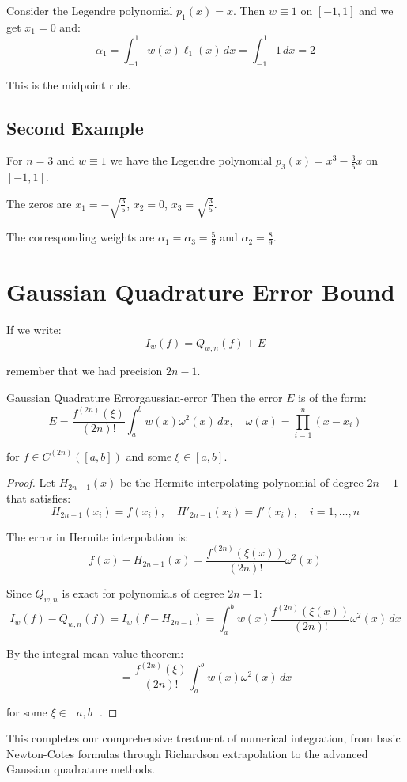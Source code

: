 Consider the Legendre polynomial $p_1(x) = x$. Then $w \equiv 1$ on $[-1,1]$ and we get $x_1 = 0$ and:
\[\alpha_1 = \int_{-1}^1 w(x) \ell_1(x) \, dx = \int_{-1}^1 1 \, dx = 2\]

This is the midpoint rule.

\subsection{Second Example}

For $n = 3$ and $w \equiv 1$ we have the Legendre polynomial $p_3(x) = x^3 - \frac{3}{5}x$ on $[-1,1]$.

The zeros are $x_1 = -\sqrt{\frac{3}{5}}$, $x_2 = 0$, $x_3 = \sqrt{\frac{3}{5}}$.

The corresponding weights are $\alpha_1 = \alpha_3 = \frac{5}{9}$ and $\alpha_2 = \frac{8}{9}$.

\section{Gaussian Quadrature Error Bound}

If we write:
\[I_w(f) = Q_{w,n}(f) + E\]

remember that we had precision $2n-1$.

\begin{theorem}{Gaussian Quadrature Error}{gaussian-error}
    Then the error $E$ is of the form:
    \[E = \frac{f^{(2n)}(\xi)}{(2n)!} \int_a^b w(x) \omega^2(x) \, dx, \quad \omega(x) = \prod_{i=1}^n (x - x_i)\]

    for $f \in C^{(2n)}([a,b])$ and some $\xi \in [a,b]$.
\end{theorem}

\begin{proof}
    Let $H_{2n-1}(x)$ be the Hermite interpolating polynomial of degree $2n-1$ that satisfies:
    \[H_{2n-1}(x_i) = f(x_i), \quad H'_{2n-1}(x_i) = f'(x_i), \quad i = 1, \ldots, n\]

    The error in Hermite interpolation is:
    \[f(x) - H_{2n-1}(x) = \frac{f^{(2n)}(\xi(x))}{(2n)!} \omega^2(x)\]

    Since $Q_{w,n}$ is exact for polynomials of degree $2n-1$:
    \[I_w(f) - Q_{w,n}(f) = I_w(f - H_{2n-1}) = \int_a^b w(x) \frac{f^{(2n)}(\xi(x))}{(2n)!} \omega^2(x) \, dx\]

    By the integral mean value theorem:
    \[= \frac{f^{(2n)}(\xi)}{(2n)!} \int_a^b w(x) \omega^2(x) \, dx\]

    for some $\xi \in [a,b]$.
\end{proof}

This completes our comprehensive treatment of numerical integration, from basic Newton-Cotes formulas through Richardson extrapolation to the advanced Gaussian quadrature methods.
